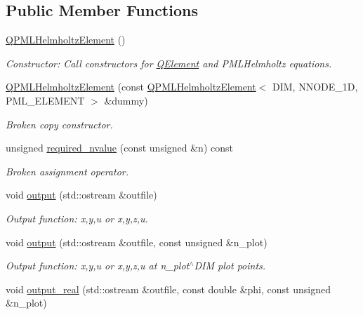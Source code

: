 \subsection*{Public Member Functions}
\begin{DoxyCompactItemize}
\item 
\hyperlink{classoomph_1_1QPMLHelmholtzElement_ae9ae56db30749a87cb44c14585925a7b}{Q\+P\+M\+L\+Helmholtz\+Element} ()
\begin{DoxyCompactList}\small\item\em Constructor\+: Call constructors for \hyperlink{classoomph_1_1QElement}{Q\+Element} and P\+M\+L\+Helmholtz equations. \end{DoxyCompactList}\item 
\hyperlink{classoomph_1_1QPMLHelmholtzElement_a84f4551641d2f72aef5939bf04d7f32d}{Q\+P\+M\+L\+Helmholtz\+Element} (const \hyperlink{classoomph_1_1QPMLHelmholtzElement}{Q\+P\+M\+L\+Helmholtz\+Element}$<$ D\+IM, N\+N\+O\+D\+E\+\_\+1D, P\+M\+L\+\_\+\+E\+L\+E\+M\+E\+NT $>$ \&dummy)
\begin{DoxyCompactList}\small\item\em Broken copy constructor. \end{DoxyCompactList}\item 
unsigned \hyperlink{classoomph_1_1QPMLHelmholtzElement_a1b766d856ec71385b799f1ab7134be9c}{required\+\_\+nvalue} (const unsigned \&n) const
\begin{DoxyCompactList}\small\item\em Broken assignment operator. \end{DoxyCompactList}\item 
void \hyperlink{classoomph_1_1QPMLHelmholtzElement_af05911b64893f693f25097dffa6a4955}{output} (std\+::ostream \&outfile)
\begin{DoxyCompactList}\small\item\em Output function\+: x,y,u or x,y,z,u. \end{DoxyCompactList}\item 
void \hyperlink{classoomph_1_1QPMLHelmholtzElement_a2a9014358af0d72ff3e06d11286beb84}{output} (std\+::ostream \&outfile, const unsigned \&n\+\_\+plot)
\begin{DoxyCompactList}\small\item\em Output function\+: x,y,u or x,y,z,u at n\+\_\+plot$^\wedge$\+D\+IM plot points. \end{DoxyCompactList}\item 
void \hyperlink{classoomph_1_1QPMLHelmholtzElement_ab530ee839ec7ad0d1e4fdaf8d6e3619e}{output\+\_\+real} (std\+::ostream \&outfile, const double \&phi, const unsigned \&n\+\_\+plot)

\end{DoxyCompactItemize}
